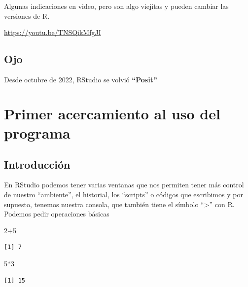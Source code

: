 \documentclass[
  letterpaper,
  DIV=11,
  numbers=noendperiod]{scrreprt}
\newenvironment{Shaded}{\begin{snugshade}}{\end{snugshade}}
\newcommand{\DecValTok}[1]{\textcolor[rgb]{0.68,0.00,0.00}{#1}}
\newcommand{\SpecialCharTok}[1]{\textcolor[rgb]{0.37,0.37,0.37}{#1}}
\begin{document}
Algunas indicaciones en video, pero son algo viejitas y pueden cambiar
las versiones de R.

\url{https://youtu.be/TNSQikMfgJI}

\hypertarget{ojo}{%
\section*{Ojo}\label{ojo}}


Desde octubre de 2022, RStudio se volvió \textbf{``Posit''}


\hypertarget{primer-acercamiento-al-uso-del-programa}{%
\chapter{Primer acercamiento al uso del
programa}\label{primer-acercamiento-al-uso-del-programa}}

\hypertarget{introducciuxf3n}{%
\section{Introducción}\label{introducciuxf3n}}

En RStudio podemos tener varias ventanas que nos permiten tener más
control de nuestro ``ambiente'', el historial, los ``scripts'' o códigos
que escribimos y por supuesto, tenemos nuestra consola, que también
tiene el símbolo ``\textgreater{}'' con R. Podemos pedir operaciones
básicas

\begin{Shaded}
\begin{Highlighting}[]
\DecValTok{2}\SpecialCharTok{+}\DecValTok{5}
\end{Highlighting}
\end{Shaded}

\begin{verbatim}
[1] 7
\end{verbatim}

\begin{Shaded}
\begin{Highlighting}[]
\DecValTok{5}\SpecialCharTok{*}\DecValTok{3}
\end{Highlighting}
\end{Shaded}

\begin{verbatim}
[1] 15
\end{verbatim}
\end{document}
